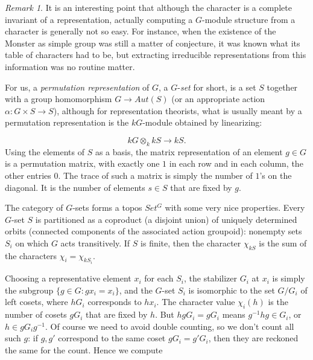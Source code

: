 \documentclass[12pt,titlepage]{article}
\theoremstyle{plain}
\theoremstyle{definition}
\theoremstyle{remark}
\newtheorem{remark}{Remark}
\begin{document}
\begin{remark}
\label{}\hypertarget{}{}
It is an interesting point that although the character is a complete invariant of a representation, actually computing a $G$-module structure from a character is generally not so easy. For instance, when the existence of the Monster as simple group was still a matter of conjecture, it was known what its table of characters had to be, but extracting irreducible representations from this information was no routine matter.

\end{remark}
For us, a \emph{permutation representation} of $G$, a $G$-\emph{set} for short, is a set $S$ together with a group homomorphism $G \to Aut(S)$ (or an appropriate action $\alpha: G \times S \to S$), although for representation theorists, what is usually meant by a permutation representation is the $k G$-module obtained by linearizing:

\begin{displaymath}
k G \otimes_k k S \to k S.
\end{displaymath}
Using the elements of $S$ as a basis, the matrix representation of an element $g \in G$ is a permutation matrix, with exactly one $1$ in each row and in each column, the other entries $0$. The trace of such a matrix is simply the number of $1$'s on the diagonal. It is the number of elements $s \in S$ that are fixed by $g$.

The category of $G$-sets forms a topos $Set^G$ with some very nice properties. Every $G$-set $S$ is partitioned as a coproduct (a disjoint union) of uniquely determined orbits (connected components of the associated action groupoid): nonempty sets $S_i$ on which $G$ acts transitively. If $S$ is finite, then the character $\chi_{k S}$ is the sum of the characters $\chi_i = \chi_{k S_i}$.

Choosing a representative element $x_i$ for each $S_i$, the stabilizer $G_i$ at $x_i$ is simply the subgroup $\{g \in G: g x_i = x_i\}$, and the $G$-set $S_i$ is isomorphic to the set $G/G_i$ of left cosets, where $h G_i$ corresponds to $h x_i$. The character value $\chi_i(h)$ is the number of cosets $g G_i$ that are fixed by $h$. But $h g G_i = g G_i$ means $g^{-1} h g \in G_i$, or $h \in g G_i g^{-1}$. Of course we need to avoid double counting, so we don't count all such $g$: if $g, g'$ correspond to the same coset $g G_i = g' G_i$, then they are reckoned the same for the count. Hence we compute
\end{document}
